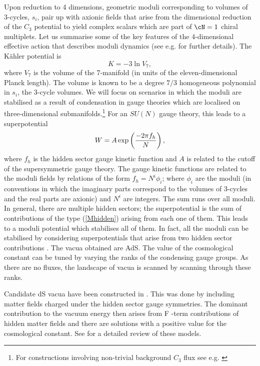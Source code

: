 Upon reduction to 4 dimensions, geometric moduli corresponding to volumes of 3-cycles, $s_i$, pair up  with axionic fields that arise from the dimensional reduction of the $C_3$ potential to yield complex scalars  which are part of $\cN=1$ chiral multiplets. Let us summarise some of the key features of the 4-dimensional effective action that describes moduli dynamics (see e.g. \cite{Friedmann:2002ty} for further details). The K\"ahler potential is
$$
    K =  -3 \ln V_7,
$$
where $V_7$ is the volume of the 7-manifold (in units of the eleven-dimensional Planck length). The volume is known to be a degree $7/3$ homogeneous polynomial in $s_i$, the 3-cycle volumes. We will focus on scenarios in which the moduli are stabilised as a result of condensation in gauge theories which are localised on three-dimensional submanifolds.\footnote{For constructions involving non-trivial background $C_3$ flux see e.g. \cite{Acharya:2002kv,  deCarlos:2004ses, House:2004pm}} For an $SU(N)$ gauge theory, this leads to a superpotential 
\begin{equation}
\label{Mhidden}
   W =  A\, {\rm{exp}} \left( {-2 \pi f_{h} \over N} \right),
\end{equation}
where $f_{h}$ is the hidden sector gauge kinetic function and $A$ is related to the cutoff of the supersymmetric gauge theory. The gauge kinetic functions are related to the moduli fields by relations of the form $f_{h} = N^{i} \phi_i$; where $\phi_i$ are the moduli (in conventions in which the imaginary parts correspond to the volumes of 3-cycles and the real parts are axionic) and $N^{i}$ are integers. The sum runs over all moduli. In general, there are multiple hidden sectors; the superpotential is the sum of contributions of the type (\ref{Mhidden}) arising from each one of them. This leads to a moduli
potential which stabilises all of them. In fact, all the moduli can be stabilised by considering superpotentials that arise from two hidden
sector contributions \cite{Acharya:2006ia, Acharya:2007rc, Acharya:2011kz}. The vacua obtained are AdS. The value of the cosmological constant can be tuned by varying the ranks of the condensing gauge groups. As there are no fluxes, the landscape of vacua is scanned  by scanning through
these ranks. 

Candidate dS vacua have been constructed in  \cite{Acharya:2007rc, Acharya:2008hi}. This was done by including matter fields charged under the hidden sector gauge symmetries.   The dominant contribution to the vacuum energy then arises  from  F -term contributions of  hidden matter fields and there are solutions with a positive value for the cosmological constant. See \cite{Acharya:2012tw} for  a detailed review of these models. 
 
